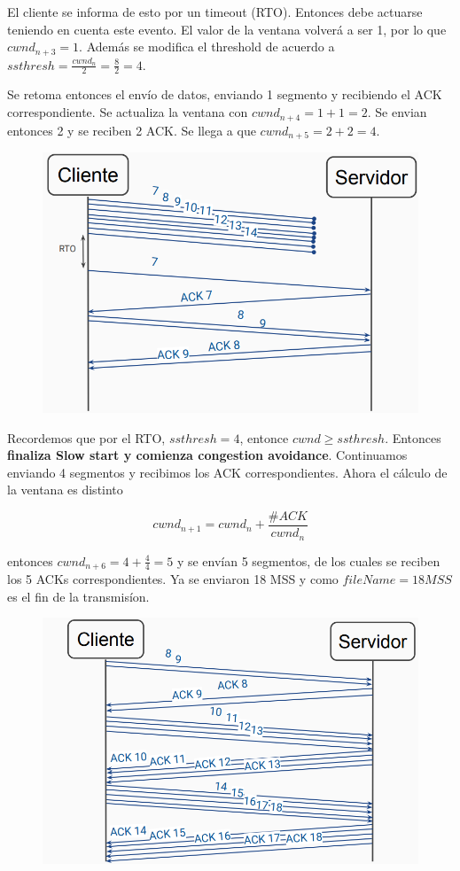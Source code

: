 \documentclass[titlepage,a4paper]{article}
\begin{document}
El cliente se informa de esto por un timeout (RTO). Entonces debe actuarse teniendo en cuenta este evento. El valor de la ventana volverá a ser 1, por lo que $ cwnd_{n+3} = 1  $. Además se modifica el threshold de acuerdo a $ ssthresh = \frac{cwnd_n}{2}  = \frac{8}{2} = 4$.

Se retoma entonces el envío de datos, enviando 1 segmento y recibiendo el ACK correspondiente. Se actualiza la ventana con $cwnd_{n+4} = 1 +1 = 2$. Se envian entonces 2 y se reciben 2 ACK. Se llega a que $cwnd_{n+5} = 2 + 2 = 4 $. 

\begin{figure}[H]
\centering
\includegraphics[width=\textwidth]{resolucion4.png}
\end{figure}

Recordemos que por el RTO,  $ ssthresh = 4 $, entonce $cwnd \geq ssthresh $. Entonces \textbf{finaliza Slow start y comienza congestion avoidance}.
Continuamos enviando 4 segmentos y recibimos los ACK correspondientes.
Ahora el cálculo de la ventana es distinto

$$ cwnd_{n+1} = cwnd_n + \frac{\#ACK}{cwnd_n} $$

entonces  $cwnd_{n+6} = 4 + \frac{4}{4} = 5 $ y se envían 5 segmentos, de los cuales se reciben los 5 ACKs correspondientes. Ya se enviaron 18 MSS y como $fileName = 18 MSS $ es el fin de la transmisíon. 

\begin{figure}[H]
\centering
\includegraphics[width=\textwidth]{resolucion5.png}
\end{figure}
\end{document}
